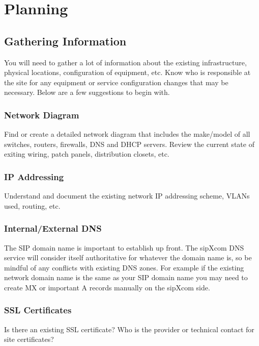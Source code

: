 \documentclass[letterpaper,10pt,english]{sphinxmanual}
\begin{document}
\ignorespaces 

\chapter{Planning}
\label{\detokenize{planning:planning}}\label{\detokenize{planning:index-0}}\label{\detokenize{planning::doc}}

\section{Gathering Information}
\label{\detokenize{planning:gathering-information}}
You will need to gather a lot of information about the existing infrastructure, physical locations, configuration of equipment, etc. Know who is responsible at the site for any equipment or service configuration changes that may be necessary. Below are a few suggestions to begin with.


\subsection{Network Diagram}
\label{\detokenize{planning:network-diagram}}
Find or create a detailed network diagram that includes the make/model of all switches, routers, firewalls, DNS and DHCP servers. Review the current state of exiting wiring, patch panels, distribution closets, etc.


\subsection{IP Addressing}
\label{\detokenize{planning:ip-addressing}}
Understand and document the existing network IP addressing scheme, VLANs used, routing, etc.


\subsection{Internal/External DNS}
\label{\detokenize{planning:internal-external-dns}}
The SIP domain name is important to establish up front. The sipXcom DNS service will consider itself authoritative for whatever the domain name is, so be mindful of any conflicts with existing DNS zones. For example if the existing network domain name is the same as your SIP domain name you may need to create MX or important A records manually on the sipXcom side.


\subsection{SSL Certificates}
\label{\detokenize{planning:ssl-certificates}}
Is there an existing SSL certificate? Who is the provider or technical contact for site certificates?
\end{document}

